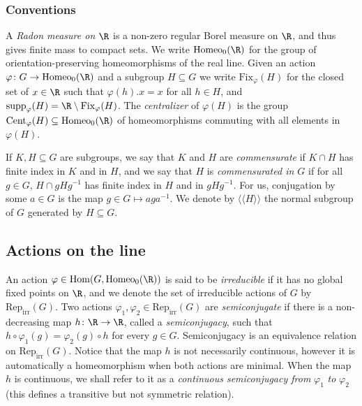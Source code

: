 \documentclass[reqno]{amsart}
\begin{document}
\subsubsection*{Conventions}
A \emph{Radon measure on $\R$} is a non-zero regular Borel measure on $\R$, and thus gives finite mass to compact sets. We write $\mathrm{Homeo}_0(\R)$ for the group of orientation-preserving homeomorphisms of the real line. Given an action $\varphi \colon G \to \mathrm{Homeo}_0(\R)$ and a subgroup $H \subseteq G$ we write $\mathrm{Fix}_\varphi(H)$ for the closed set of $x \in \R$ such that $\varphi(h).x = x$ for all $h \in H$, and $\mathrm{supp}_\varphi(H) = \R \setminus \mathrm{Fix}_\varphi(H)$. The \emph{centralizer} of $\varphi(H)$ is the group $\mathrm{Cent}_\varphi(H) \subseteq \mathrm{Homeo}_0(\R)$ of homeomorphisms commuting with all elements in $\varphi(H)$.

If $K, H \subseteq G$ are subgroups, we say that $K$ and $H$ are \emph{commensurate} if $K\cap H$ has finite index in $K$ and in $H$, and we say that $H$ is \emph{commensurated in $G$} if for all $g \in G$, $H \cap gH g^{-1}$ has finite index in $H$ and in $gHg^{-1}$. For us, conjugation by some $a \in G$ is the map $g \in G \mapsto aga^{-1}$. We denote by $\langle \langle H \rangle \rangle$ the normal subgroup of $G$ generated by $H \subseteq G$.

\subsection{Actions on the line} 
An action $\varphi \in \mathrm{Hom}(G, \mathrm{Homeo}_0(\R))$ is said to be \emph{irreducible} if it has no global fixed points on $\R$, and we denote the set of irreducible actions of $G$ by $\mathrm{Rep}_\mathrm{irr}(G)$.
Two actions $\varphi_1, \varphi_2 \in \mathrm{Rep}_\mathrm{irr}(G)$ are \emph{semiconjugate}  if there is a non-decreasing map $h\colon \R\to \R$,  called a \emph{semiconjugacy}, such that $h \circ \varphi_1(g) = \varphi_2(g) \circ h$ for every $g \in G$. Semiconjugacy is an equivalence relation on $\mathrm{Rep}_\mathrm{irr}(G)$. Notice that the map $h$ is not necessarily continuous, however it is automatically a homeomorphism  when both actions are minimal. When the map $h$ is continuous, we shall refer to it as a \emph{continuous semiconjugacy from} $\varphi_1$ \emph{to} $\varphi_2$ (this defines a transitive but not symmetric relation).
\end{document}
